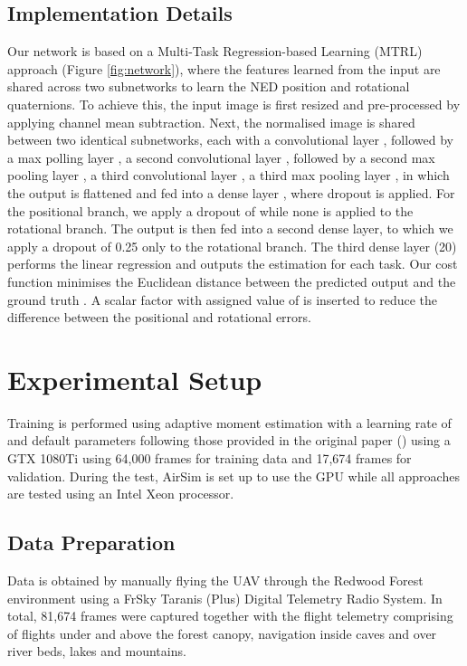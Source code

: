 \documentclass[letterpaper, 10 pt, journal, twoside]{IEEEtran}
\begin{document}
\subsection{Implementation Details}

Our network is based on a Multi-Task Regression-based Learning (MTRL) approach (Figure \ref{fig:network}), where the features learned from the input are shared across two subnetworks to learn the NED position and rotational quaternions. To achieve this, the input image is first resized and pre-processed by applying channel mean subtraction. Next, the normalised image is shared between two identical subnetworks, each with a convolutional layer , followed by a max polling layer , a second convolutional layer , followed by a second max pooling layer , a third convolutional layer , a third max pooling layer , in which the output is flattened  and fed into a dense layer , where dropout is applied. For the positional branch, we apply a dropout of  while none is applied to the rotational branch. The output is then fed into a second dense layer, to which we apply a dropout of 0.25 only to the rotational branch. The third dense layer (20) performs the linear regression and outputs the estimation for each task.  Our cost function  minimises the Euclidean distance between the predicted output  and the ground truth . A scalar factor  with assigned value of  is inserted to reduce the difference between the positional and rotational errors.\vspace{-0.2cm}

     \section{Experimental Setup}

Training is performed using adaptive moment estimation \cite{kingma2014adam} with a learning rate of  and default  parameters following those provided in the original paper () \cite{kingma2014adam} using a GTX 1080Ti using 64,000 frames for training data and 17,674 frames for validation. During the test, AirSim is set up to use the GPU while all approaches are tested using an Intel Xeon processor.\vspace{-0.1cm}

\subsection{Data Preparation} 
Data is obtained by manually flying the UAV through the Redwood Forest environment using a FrSky Taranis (Plus) Digital Telemetry Radio System. In total, 81,674 frames were captured together with the flight telemetry comprising of flights under and above the forest canopy, navigation inside caves and over river beds, lakes and mountains.\vspace{-0.1cm}
\end{document}
